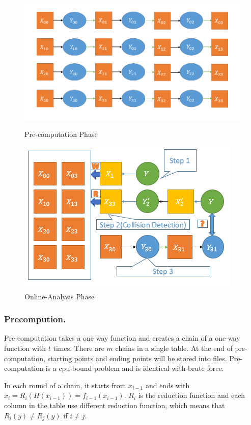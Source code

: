 \documentclass[runningheads,a4paper]{llncs}
\begin{document}
\begin{figure}[!htb]
  \includegraphics[width=\linewidth]{graph2}
  \caption{Pre-computation Phase}
\endminipage\hfill
{}
  \includegraphics[width=\linewidth]{graph3}
  \caption{Online-Analysis Phase}\label{fig:awesome_image2}
\endminipage\hfill
\end{figure}

\subsubsection{Precompution.} Pre-computation takes a one way function and creates a chain of a one-way function with $t$ times. There are $m$ chains in a single table. At the end of pre-computation, starting points and ending points will be stored into files. Pre-computation is a cpu-bound problem and is identical with brute force.

In each round of a chain, it starts from $x_{i-1}$ and ends with $ x_i = R_i(H(x_{i−1})) = f_{i−1}(x_{i−1})$. $R_i$ is the reduction function and each column in the table use different reduction function, which means that $R_i(y) \neq R_j(y)$ if $i \neq j$.
\end{document}
